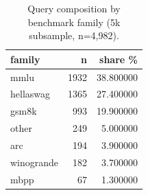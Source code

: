\begin{table}
\caption{Query composition by benchmark family (5k subsample, n=4,982).}
\label{tab:composition}
\begin{tabular}{lrr}
\toprule
family & n & share \% \\
\midrule
mmlu & 1932 & 38.800000 \\
hellaswag & 1365 & 27.400000 \\
gsm8k & 993 & 19.900000 \\
other & 249 & 5.000000 \\
arc & 194 & 3.900000 \\
winogrande & 182 & 3.700000 \\
mbpp & 67 & 1.300000 \\
\bottomrule
\end{tabular}
\end{table}
